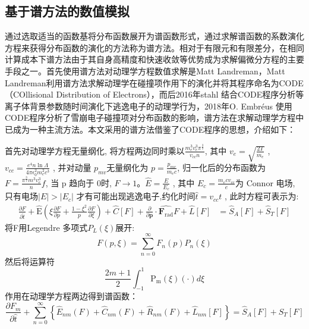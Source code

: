 \subsection{基于谱方法的数值模拟}
通过选取适当的函数基将分布函数展开为谱函数形式，通过求解谱函数的系数演化方程来获得分布函数的演化的方法称为谱方法。相对于有限元和有限差分，在相同计算成本下谱方法由于其自身高精度和快速收敛等优势成为求解偏微分方程的主要手段之一\cite{RN2027}。首先使用谱方法对动理学方程数值求解是Matt Landreman\cite{RN814}，Matt Landreman利用谱方法求解动理学在碰撞项作用下的演化并将其程序命名为CODE（COllisional Distribution of Electrons），而后2016年stahl\cite{RN1809}		结合CODE程序分析等离子体背景参数随时间演化下逃逸电子的动理学行为，2018年O. Embréus\cite{RN1811}	使用CODE程序分析了雪崩电子碰撞项对分布函数的影响，谱方法在求解动理学方程中已成为一种主流方法。本文采用的谱方法借鉴了CODE程序的思想，介绍如下：\par
首先对动理学方程无量纲化, 将方程两边同时乘以$\frac{m_{e}^{3} v_{e}^{3} \pi^{\frac{3}{2}}}{v_{c c} n} $, 其中 $ v_{e}=\sqrt{\frac{2 T}{m_{e}}}$ , $ v_{c c}=\frac{e^{4} n \ln \Lambda}{4 \pi \epsilon_{0}^{2} m_{e}^{2} c^{3}}$ , 并对动量 $ p_{m v}  $无量纲化为 $ p=\frac{p_{m v}}{m_{e} c} $, 归一化后的分布函数为$F=\frac{\pi^{\frac{3}{2}} m^{3} v_{e}^{3}}{n} f$, 当  p  趋向于 0时, $F \rightarrow 1$。$ \hat{E}=\frac{E}{E_{c}}$ , 其中  $E_{c}=\frac{m_{e} c v_{c c}}{e}  $为 Connor 电场, 只有电场$  |E|>   \left|E_{c}\right|$  才有可能出现逃逸电子\cite{RN1875},约化时间$ \hat{t}=v_{c c} t$ , 此时方程可表示为:
\begin{align}\label{eq:Specnorm}
\frac{\partial F}{\partial \hat{t}}+\widehat{\mathrm{E}}\left(\xi \frac{\partial F}{\partial p}+\frac{1-\xi^{2}}{p} \frac{\partial F}{\partial \xi}\right)+\hat{C}[F]+\frac{\partial}{\partial \boldsymbol{p}} \cdot \widehat{\boldsymbol{F}_{\mathrm{rad}}} F+\widehat{L}[F] & = \hat{S}_{A}[F]+\hat{S}_{T}[F]\end{align}
将F用Legendre 多项式$P_L (ξ)$展开:
\begin{equation}
F(p, \xi)=\sum_{n=0}^{\infty} F_{n}(p) P_{n}(\xi)
\end{equation}
然后将运算符
\begin{equation}
\frac{2 m+1}{2} \int_{-1}^{1} \mathrm{P}_{\mathrm{m}}(\xi)(\cdot) d \xi
\end{equation}
作用在动理学方程两边得到谱函数：
\begin{equation}\label{eq:Fnm}
\frac{\partial F_{m}}{\partial \hat{t}}+\sum_{n=0}^{\infty}\left\{\hat{E}_{n m}(F)+\hat{C}_{n m}(F)+\hat{R}_{n m}(F)+\hat{L}_{n m}[F]\right\}=\hat{S}_{A}[F]+\hat{S}_{T}[F]
\end{equation}
